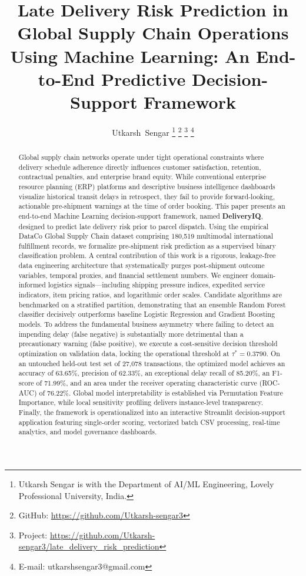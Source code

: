 \documentclass[journal,10pt,twocolumn]{IEEEtran}
\begin{document}
\title{Late Delivery Risk Prediction in Global Supply Chain Operations Using Machine Learning: An End-to-End Predictive Decision-Support Framework}

\author{Utkarsh~Sengar%
\thanks{Utkarsh Sengar is with the Department of AI/ML Engineering, Lovely Professional University, India.}%
\thanks{GitHub: \url{https://github.com/Utkarsh-sengar3}}%
\thanks{Project: \url{https://github.com/Utkarsh-sengar3/late_delivery_risk_prediction}}%
\thanks{E-mail: utkarshsengar3@gmail.com}%
}

\maketitle

\begin{abstract}
Global supply chain networks operate under tight operational constraints where delivery schedule adherence directly influences customer satisfaction, retention, contractual penalties, and enterprise brand equity. While conventional enterprise resource planning (ERP) platforms and descriptive business intelligence dashboards visualize historical transit delays in retrospect, they fail to provide forward-looking, actionable pre-shipment warnings at the time of order booking. This paper presents an end-to-end Machine Learning decision-support framework, named \textbf{DeliveryIQ}, designed to predict late delivery risk prior to parcel dispatch. Using the empirical DataCo Global Supply Chain dataset comprising 180,519 multimodal international fulfillment records, we formalize pre-shipment risk prediction as a supervised binary classification problem. A central contribution of this work is a rigorous, leakage-free data engineering architecture that systematically purges post-shipment outcome variables, temporal proxies, and financial settlement numbers. We engineer domain-informed logistics signals---including shipping pressure indices, expedited service indicators, item pricing ratios, and logarithmic order scales. Candidate algorithms are benchmarked on a stratified partition, demonstrating that an ensemble Random Forest classifier decisively outperforms baseline Logistic Regression and Gradient Boosting models. To address the fundamental business asymmetry where failing to detect an impending delay (false negative) is substantially more detrimental than a precautionary warning (false positive), we execute a cost-sensitive decision threshold optimization on validation data, locking the operational threshold at $\tau^* = 0.3790$. On an untouched held-out test set of 27,078 transactions, the optimized model achieves an accuracy of 63.65\%, precision of 62.33\%, an exceptional delay recall of 85.20\%, an F1-score of 71.99\%, and an area under the receiver operating characteristic curve (ROC-AUC) of 76.22\%. Global model interpretability is established via Permutation Feature Importance, while local sensitivity profiling delivers instance-level transparency. Finally, the framework is operationalized into an interactive Streamlit decision-support application featuring single-order scoring, vectorized batch CSV processing, real-time analytics, and model governance dashboards.
\end{abstract}
\end{document}
